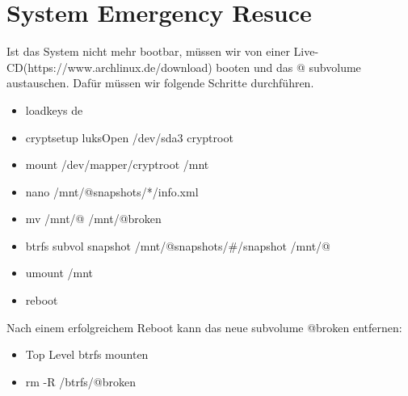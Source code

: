 \documentclass[11pt,a4paper]{article}
\begin{document}
\section{System Emergency Resuce}
Ist das System nicht mehr bootbar, müssen wir von einer Live-CD(https://www.archlinux.de/download) booten und das @ subvolume austauschen.
Dafür müssen wir folgende Schritte durchführen.
\begin{itemize}
\item loadkeys de
\item cryptsetup luksOpen /dev/sda3 	cryptroot
\item mount /dev/mapper/cryptroot /mnt
\item nano /mnt/@snapshots/*/info.xml
\item mv /mnt/@ /mnt/@broken
\item btrfs subvol snapshot /mnt/@snapshots/\#/snapshot /mnt/@
\item umount /mnt
\item reboot
\end{itemize}
Nach einem erfolgreichem Reboot kann das neue subvolume @broken entfernen:
\begin{itemize}
\item Top Level btrfs mounten
\item rm -R /btrfs/@broken
\end{itemize}
\end{document}

